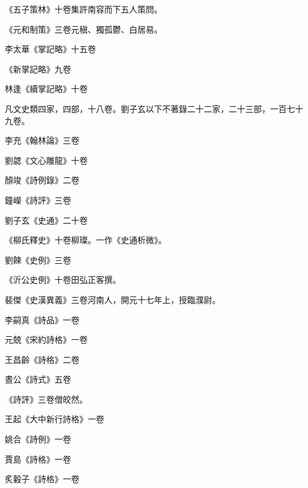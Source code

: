 \begin{pinyinscope}
 《五子策林》十卷集許南容而下五人策問。



 《元和制策》三卷元稹、獨孤鬱、白居易。



 李太華《掌記略》十五卷



 《新掌記略》九卷



 林逢《續掌記略》十卷



 凡文史類四家，四部，十八卷。劉子玄以下不著錄二十二家，二十三部，一百七十九卷。



 李充《翰林論》三卷



 劉勰《文心雕龍》十卷



 顏竣《詩例錄》二卷



 鐘嶸《詩評》三卷



 劉子玄《史通》二十卷



 《柳氏釋史》十卷柳璨。一作《史通析微》。



 劉餗《史例》三卷



 《沂公史例》十卷田弘正客撰。



 裴傑《史漢異義》三卷河南人，開元十七年上，授臨濮尉。



 李嗣真《詩品》一卷



 元兢《宋約詩格》一卷



 王昌齡《詩格》二卷



 晝公《詩式》五卷



 《詩評》三卷僧皎然。



 王起《大中新行詩格》一卷



 姚合《詩例》一卷



 賈島《詩格》一卷



 炙轂子《詩格》一卷




\end{pinyinscope}
